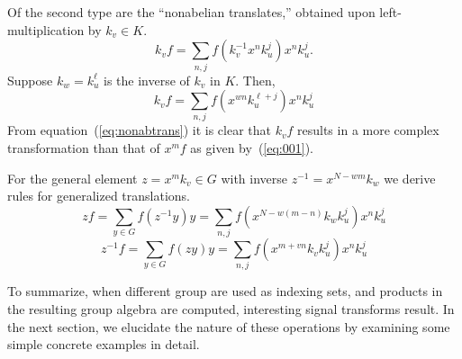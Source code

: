 \documentclass[reqno,onecolumn,oneside]{paper}
\newcommand{\<}{\ensuremath{\langle}}
\renewcommand{\>}{\ensuremath{\rangle}}
\newcommand{\zmv}{\ensuremath{x^m k_v}}
\newcommand{\zmvInv}{\ensuremath{x^{N-wm} k_w}}
\begin{document}
Of the second type are the ``nonabelian translates,'' 
obtained upon left-multiplication by $k_v \in K$.
\begin{equation}
  k_vf %
  = \sum_{n,j} f(k_v^{-1}x^n k_u^j)x^n k_u^j.
\end{equation}
Suppose $k_w = k_u^\ell$ is the inverse of $k_v$ in $K$.  Then,
\begin{equation}
  k_vf %
  = \sum_{n,j} f(x^{wn}k_u^{\ell + j})x^n k_u^j\label{eq:nonabtrans}
\end{equation}
From equation~(\ref{eq:nonabtrans}) it is clear that $k_vf$ 
results in a more complex transformation than that of 
$x^m f$ as given by~(\ref{eq:001}).


For the general element $z = \zmv \in G$ with 
inverse $z^{-1}=\zmvInv$ %
we derive rules for generalized translations.
\begin{equation*}
  zf = \sum_{y\in G} f(z^{-1}y)y= \sum_{n,j} f(x^{N-w(m-n)} k_w k_u^j)x^n k_u^j
\end{equation*}
\begin{equation*}
  z^{-1}f = \sum_{y\in G} f(zy)y= \sum_{n,j} f(x^{m+vn} k_vk_u^j)x^n k_u^j
\end{equation*}


To summarize, when different group are used as indexing sets,
and products in the resulting group algebra are computed, 
interesting signal transforms result.  In the next section,
we elucidate the nature of these operations by
examining some simple concrete examples in detail.

%

\end{document}
